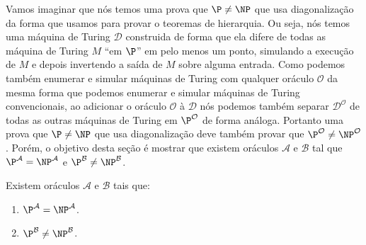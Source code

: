 Vamos imaginar que nós temos uma prova que $\P \neq \NP$ que usa diagonalização da forma que usamos para provar o teoremas de hierarquia. Ou seja, nós temos uma máquina de Turing $\mathcal{D}$ construida de forma que ela difere de todas as máquina de Turing $M$ ``em $\P$'' em pelo menos um ponto, simulando a execução de $M$ e depois invertendo a saída de $M$ sobre alguma entrada. Como podemos também enumerar e simular máquinas de Turing com qualquer oráculo $\mathcal{O}$ da mesma forma que podemos enumerar e simular máquinas de Turing convencionais, ao adicionar o oráculo $\mathcal{O}$ à $\mathcal{D}$ nós podemos também separar $\mathcal{D}^{\mathcal{O}}$ de todas as outras máquinas de Turing em $\P^{\mathcal{O}}$ de forma análoga. Portanto uma prova que $\P \neq \NP$ que usa diagonalização deve também provar que $\P^{\mathcal{O}} \neq \NP^{\mathcal{O}}$. Porém, o objetivo desta seção é mostrar que existem oráculos $\mathcal{A}$ e $\mathcal{B}$ tal que $\P^{\mathcal{A}} = \NP^{\mathcal{A}}$ e $\P^{\mathcal{B}} \neq \NP^{\mathcal{B}}$.

\begin{teo} \label{teo: bgs}

Existem oráculos $\mathcal{A}$ e $\mathcal{B}$ tais que:

\begin{enumerate}

\item $\P^{\mathcal{A}} = \NP^{\mathcal{A}}$.

\item $\P^{\mathcal{B}} \neq \NP^{\mathcal{B}}$.

\end{enumerate}

\end{teo}

